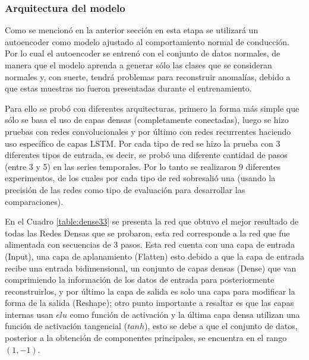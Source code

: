 \subsubsection{Arquitectura del modelo}

Como se mencion\'{o} en la anterior secci\'{o}n en esta etapa se utilizar\'{a} un autoencoder como modelo ajustado al comportamiento normal de conducci\'{o}n. Por lo cual el autoencoder se entren\'{o} con el conjunto de datos normales, de manera que el modelo aprenda a generar s\'{o}lo las clases que se consideran normales y, con suerte, tendr\'{a} problemas para reconstruir anomal\'{i}as, debido a que estas muestras no fueron presentadas durante el entrenamiento.

\vspace{5mm} %

Para ello se prob\'{o} con diferentes arquitecturas, primero la forma m\'{a}s simple que s\'{o}lo se basa el uso de capas densas (completamente conectadas), luego se hizo pruebas con redes convolucionales y por \'{u}ltimo con redes recurrentes haciendo uso espec\'{i}fico de capas LSTM. Por cada tipo de red se hizo la prueba con 3 diferentes tipos de entrada, es decir, se prob\'{o} una diferente cantidad de pasos (entre 3 y  5) en las series temporales. Por lo tanto se realizaron 9 diferentes experimentos, de los cuales por cada tipo de red sobresali\'{o} una (usando la precisi\'{o}n de las redes como tipo de evaluaci\'{o}n para desarrollar las comparaciones).

\vspace{5mm} %

En el Cuadro \ref{table:dense33} se presenta la red que obtuvo el mejor resultado de todas las Redes Densas que se probaron, esta red corresponde a la red que fue alimentada con secuencias de 3 pasos. Esta red cuenta con una capa de entrada (Input), una capa de aplanamiento (Flatten) esto debido a que la capa de entrada recibe una entrada bidimensional, un conjunto de capas densas (Dense) que van comprimiendo la informaci\'{o}n de los datos de entrada para posteriormente reconstruirlos, y por \'{u}ltimo la capa de salida es solo una capa para modificar la forma de la salida (Reshape); otro punto importante a resaltar es que las capas internas usan $elu$ como funci\'{o}n de activaci\'{o}n y la \'{u}ltima capa densa utilizan una funci\'{o}n de activaci\'{o}n tangencial ($tanh$), esto se debe a que el conjunto de datos, posterior a la obtenci\'{o}n de componentes principales, se encuentra en el rango $(1, -1)$.


